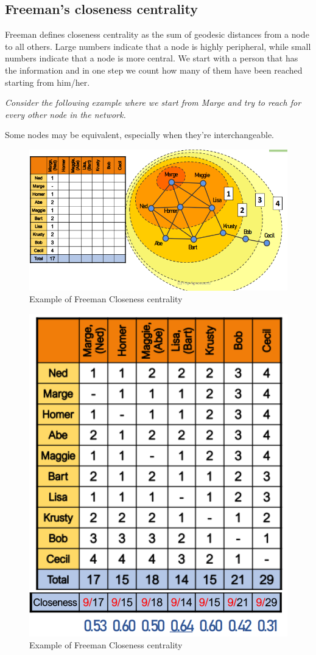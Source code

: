 \documentclass[
  notitlepage,
  onecolumn,
  openany]{book}
\begin{document}
\hypertarget{freemans-closeness-centrality}{%
\subsection{Freeman's closeness centrality}\label{freemans-closeness-centrality}}

Freeman defines closeness centrality as the sum of geodesic distances from a node to all others. Large numbers indicate that a node is highly peripheral, while small numbers indicate that a node is more central. We start with a person that has the information and in one step we count how many of them have been reached starting from him/her.

\emph{Consider the following example where we start from Marge and try to reach for every other node in the network.}

Some nodes may be equivalent, especially when they're interchangeable.

\begin{figure}

{\centering \includegraphics[width=0.8\linewidth]{images/04-Centrality/Untitled} 

}

\caption{Example of Freeman Closeness centrality}\label{fig:unnamed-chunk-12}
\end{figure}
\begin{figure}

{\centering \includegraphics[width=0.4\linewidth]{images/04-Centrality/Untitled 1} 

}

\caption{Example of Freeman Closeness centrality}\label{fig:unnamed-chunk-13}
\end{figure}
\end{document}
